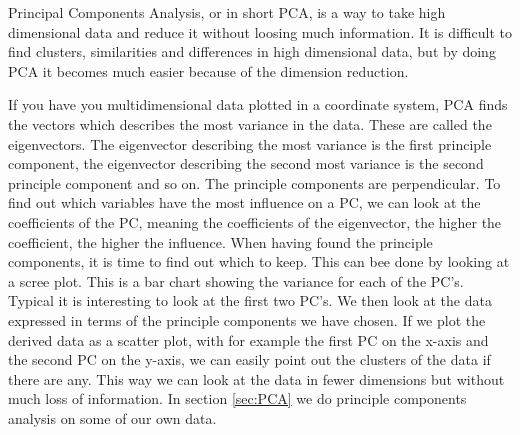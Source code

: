 \documentclass[Report.tex]{subfiles}
\begin{document}
Principal Components Analysis, or in short PCA, is a way to take high dimensional data and reduce it without loosing much information. It is difficult to find clusters, similarities and differences in high dimensional data, but by doing PCA it becomes much easier because of the dimension reduction. \cite{PCAtheory}

If you have you multidimensional data plotted in a coordinate system, PCA finds the vectors which describes the most variance in the data. These are called the eigenvectors. The eigenvector describing the most variance is the first principle component, the eigenvector describing the second most variance is the second principle component and so on. The principle components are perpendicular. To find out which variables have the most influence on a PC, we can look at the coefficients of the PC, meaning the coefficients of the eigenvector, the higher the coefficient, the higher the influence. 
When having found the principle components, it is time to find out which to keep. This can bee done by looking at a scree plot. This is a bar chart showing the variance for each of the PC's. Typical it is interesting to look at the first two PC's. We then look at the data expressed in terms of the principle components we have chosen. If we plot the derived data as a scatter plot, with for example the first PC on the x-axis and the second PC on the y-axis, we can easily point out the clusters of the data if there are any. This way we can look at the data in fewer dimensions but without much loss of information. In section \ref{sec:PCA} we do principle components analysis on some of our own data.
\end{document}
